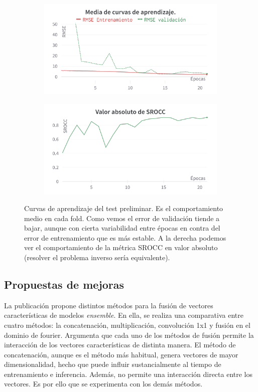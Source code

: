 \begin{figure}[htp]
  \begin{subfigure}[b]{0.49\textwidth}
  \centering
    \includegraphics[width=\textwidth]{imagenes/chapter5/PreTestCurves.png}
  \end{subfigure}
  \begin{subfigure}[b]{0.49\textwidth}
  \centering
    \includegraphics[width=\textwidth]{imagenes/chapter5/PreTestSROCC.png}
  \end{subfigure}
  \caption[Curvas de aprendizaje del test preliminar.]{Curvas de aprendizaje del test preliminar. Es el comportamiento medio en cada fold.
  Como vemos el error de validación tiende a bajar, aunque con cierta variabilidad 
  entre épocas en contra del error de entrenamiento que es más estable. A la derecha 
  podemos ver el comportamiento de la métrica SROCC en valor absoluto 
  (resolver el problema inverso sería equivalente).}
  \label{fig:PreTestCurves}
\end{figure}


\subsection{Propuestas de mejoras}
La publicación \cite{EnsemblePCQA} propone distintos métodos para la fusión de vectores características de modelos \emph{ensemble}.
En ella, se realiza una comparativa entre cuatro métodos: la concatenación, multiplicación, convolución 1x1 y 
fusión en el dominio de fourier. 
Argumenta que cada uno de los métodos de fusión permite la interacción de los vectores 
características de distinta manera. El método de concatenación, aunque es el método 
más habitual, genera vectores de mayor dimensionalidad, hecho que puede influir 
sustancialmente al tiempo de entrenamiento e inferencia. Además, no permite una interacción directa entre los vectores. 
Es por ello que se experimenta con los demás métodos.  

